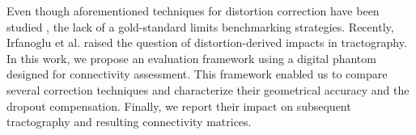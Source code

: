 Even though aforementioned techniques for distortion correction
have been studied \cite{zeng_image_2002,wu_comparison_2008},
the lack of a gold-standard limits benchmarking 
strategies. Recently, Irfanoglu et al.
\cite{irfanoglu_effects_2012} raised the question
of distortion-derived impacts in tractography.
In this work, we propose an evaluation framework
using a digital phantom designed for connectivity assessment.
This framework enabled us to compare several correction 
techniques and characterize their geometrical accuracy 
and the dropout compensation. Finally, we report their 
impact on subsequent tractography and resulting connectivity
matrices.